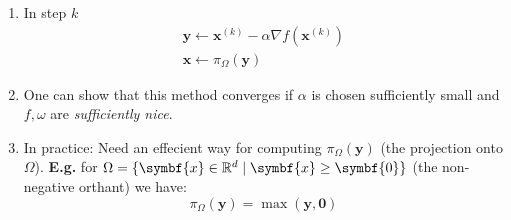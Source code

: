 \begin{enumerate}
  \item In step \(k\)
        \begin{align*}
          \symbf{y} \leftarrow \symbf{x}^{(k)} - \alpha \nabla f(\symbf{x}^{(k)}) \\
          \symbf{x} \leftarrow \pi_{\Omega}(\symbf{y})
        \end{align*}
  \item One can show that this method converges if \(\alpha\) is chosen sufficiently small and \(f, \omega\) are \emph{sufficiently nice}.
  \item In practice: Need an effecient way for computing \(\pi_{\Omega}(\symbf{y})\) (the projection onto \(\Omega\)).
        \textbf{E.g.} for \(\Omega = \{ \symbf{x} \in \R^d \mid \symbf{x} \geq \symbf{0} \}\) (the non-negative orthant) we have:
        \[
          \pi_{\Omega}(\symbf{y}) = \max(\symbf{y}, \symbf{0})
        \]
        \begin{center}
        \end{center}

\end{enumerate}


